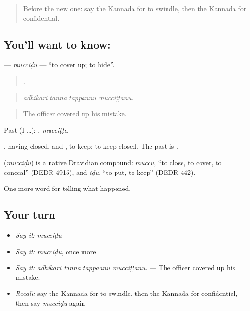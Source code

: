 \label{lesson:KA-C357-muccidu}



\begin{quote}
Before the new one: say the Kannada for to swindle, then the Kannada for confidential.
\end{quote}

\subsection*{You'll want to know: }
\textbf{} — \emph{mucciḍu} — \textquotedblleft{}to cover up; to hide\textquotedblright{}.

\begin{quote}
   .
\end{quote}

\begin{quote}
\emph{adhikāri tanna tappannu mucciṭṭanu.}
\end{quote}

\begin{quote}
The officer covered up his mistake.
\end{quote}

Past (I …): , \emph{mucciṭṭe}.

, having closed, and , to keep: to keep closed. The past is .

\begin{cousinweb}
\textbf{} (\emph{mucciḍu}) is a native Dravidian compound: \emph{muccu}, \textquotedblleft{}to close, to cover, to conceal\textquotedblright{} (DEDR 4915), and \emph{iḍu}, \textquotedblleft{}to put, to keep\textquotedblright{} (DEDR 442).
\end{cousinweb}

\begin{grammarlens}[title={What you've built}]
One more word for telling what happened.
\end{grammarlens}

\subsection*{Your turn}
\begin{itemize}
\raggedright
  \item \emph{Say it:} \emph{mucciḍu}
  \item \emph{Say it:} \emph{mucciḍu}, once more
  \item \emph{Say it:} \emph{adhikāri tanna tappannu mucciṭṭanu.} — The officer covered up his mistake.
  \item \emph{Recall:} say the Kannada for to swindle, then the Kannada for confidential, then say \emph{mucciḍu} again
\end{itemize}

